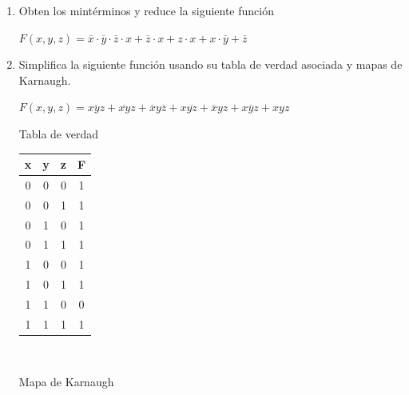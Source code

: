 \documentclass[a4paper,12pt]{article}
\begin{document}
\begin{enumerate}[label=\textcolor{teal}{\textbf{\arabic*.}}]

    \item Obten los mintérminos y reduce la siguiente función 
        \begin{center}
            $F(x,y,z) = \overline{x} \cdot \overline{y} \cdot \overline{z} \cdot x + \overline{z} \cdot x + z \cdot x + x \cdot \overline{y} + \overline{z} $
        \end{center}

    \item Simplifica la siguiente función usando su tabla de verdad asociada y mapas de Karnaugh.
    
        \begin{center}
            $F(x,y,z) = \overline{xyz} + \overline{xy} z + \overline{x} y \overline{z} + x \overline{yz} +  \overline{x} yz +x \overline{y} z +xyz $
        \end{center}

        Tabla de verdad

        \begin{center}
            \begin{table}[h]
            \centering
            \begin{tabular}{|c|c|c|c|}
                \hline
                x & y & z & F \\ 
                \hline
                0 & 0 & 0 & 1 \\ 
                \hline 
                0 & 0 & 1 & 1 \\ 
                \hline 
                0 & 1 & 0 & 1 \\ 
                \hline 
                0 & 1 & 1 & 1 \\ 
                \hline 
                1 & 0 & 0 & 1 \\ 
                \hline 
                1 & 0 & 1 & 1 \\ 
                \hline 
                1 & 1 & 0 & 0 \\
                \hline 
                1 & 1 & 1 & 1 \\ 
                \hline 
            \end{tabular}\\
        \end{table}
        \end{center}

        Mapa de Karnaugh


\end{enumerate}
\end{document}
